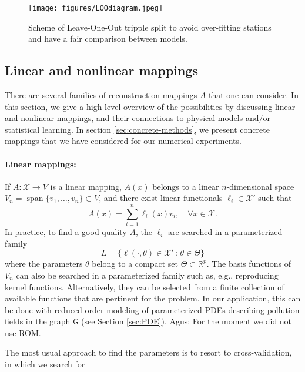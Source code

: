 \documentclass[11pt,a4paper,twoside]{article}
\theoremstyle{definition}
\numberwithin{equation}{section}
\newcommand{\cX}{\ensuremath{\mathcal{X}}}
\newcommand{\bR}{\ensuremath{\mathbb{R}}}
\newcommand{\G}{\ensuremath{\textsf{G}}} %
\newcommand{\<}{\langle}
\renewcommand{\>}{\rangle}
\newcommand{\vspan}{\operatorname{span}}
\newcommand{\cond}{\ensuremath{\,:\,}}
\newcommand{\ascomment}[1]{{\color{teal} Agus: #1}}
\begin{document}
\begin{figure}
    \centering
    \texttt{[image: figures/LOOdiagram.jpeg]}
    \caption{Scheme of Leave-One-Out tripple split to avoid over-fitting stations and have a fair comparison between models.}
    \label{fig:loodiagram}
\end{figure}

\subsection{Linear and nonlinear mappings}
\label{sec:mappings}
There are several families of reconstruction mappings $A$ that one can consider. In this section, we give a high-level overview of the possibilities by discussing  linear and nonlinear mappings, and their connections to physical models and/or statistical learning. In section \ref{sec:concrete-methods}, we present concrete mappings that we have considered for our numerical experiments.

\paragraph{Linear mappings:} If $A: \cX\to V$ is a linear mapping, $A(x)$ belongs to a linear $n$-dimensional space $V_n = \vspan\{v_1,\dots, v_n\} \subset V$, and there exist linear functionals $\ell_i \in \cX'$ such that
$$
A(x) = \sum_{i=1}^n \ell_i(x) v_i, \quad \forall x \in \cX.
$$
In practice, to find a good quality $A$, the $\ell_i$ are searched in a parameterized family
$$
L = \{\ell(\cdot , \theta) \in \cX' \cond \theta \in \Theta\}
$$
where the parameters $\theta$ belong to a compact set $\Theta \subset \bR^p$. The basis functions of $V_n$ can also be searched in a parameterized family such as, e.g., reproducing kernel functions. Alternatively, they can be selected from a finite collection of available functions that are pertinent for the problem. In our application, this can be done with reduced order modeling of parameterized PDEs describing pollution fields in the graph $\G$ (see Section \ref{sec:PDE}). \ascomment{For the moment we did not use ROM.}

The most usual approach to find the parameters is to resort to cross-validation, in which we search for
\end{document}
